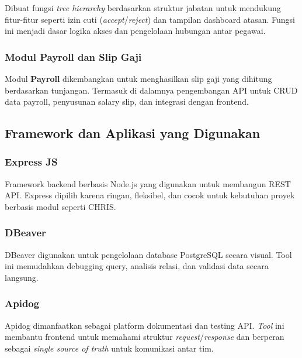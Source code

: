 Dibuat fungsi \textit{tree hierarchy} berdasarkan struktur jabatan untuk mendukung fitur-fitur seperti izin cuti (\textit{accept}/\textit{reject}) dan tampilan dashboard atasan. Fungsi ini menjadi dasar logika akses dan pengelolaan hubungan antar pegawai.
\subsubsection{Modul Payroll dan Slip Gaji}

Modul \textbf{Payroll} dikembangkan untuk menghasilkan slip gaji yang dihitung berdasarkan tunjangan. Termasuk di dalamnya pengembangan API untuk CRUD data payroll, penyusunan salary slip, dan integrasi dengan frontend.


\subsection{Framework dan Aplikasi yang Digunakan}

\subsubsection{Express JS}

Framework backend berbasis Node.js yang digunakan untuk membangun REST API\@. Express dipilih karena ringan, fleksibel, dan cocok untuk kebutuhan proyek berbasis modul seperti CHRIS\@.
\subsubsection{DBeaver}

DBeaver digunakan untuk pengelolaan database PostgreSQL secara visual. Tool ini memudahkan debugging query, analisis relasi, dan validasi data secara langsung.
\subsubsection{Apidog}
Apidog dimanfaatkan sebagai platform dokumentasi dan testing API\@. \textit{Tool} ini membantu frontend untuk memahami struktur \textit{request}/\textit{response} dan berperan sebagai \textit{single source of truth} untuk komunikasi antar tim.
\clearpage

